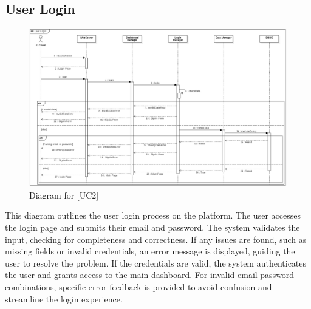 \subsection{User Login}
\begin{figure} [H]
    \centering
    \includegraphics[width=1\linewidth]{DD/Images/Runtime Sequence Diagram Images/user_login.png}
    \caption{Diagram for [UC2]}
    \label{fig: User Login Diagram}
\end{figure}
This diagram outlines the user login process on the platform. The user accesses the login page and submits their email and password. The system validates the input, checking for completeness and correctness. If any issues are found, such as missing fields or invalid credentials, an error message is displayed, guiding the user to resolve the problem. If the credentials are valid, the system authenticates the user and grants access to the main dashboard. For invalid email-password combinations, specific error feedback is provided to avoid confusion and streamline the login experience.

